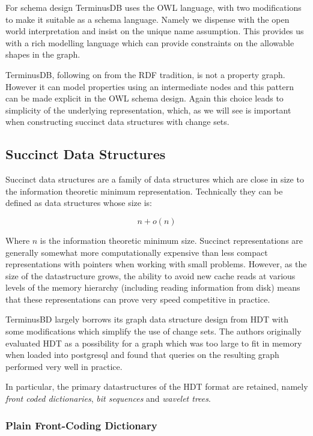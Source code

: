 \documentclass[10pt, a4paper, twocolumn]{article} %
\begin{document}
For schema design TerminusDB uses the OWL language, with two
modifications to make it suitable as a schema language. Namely we
dispense with the open world interpretation and insist on the unique
name assumption\cite{DBLP:journals/semweb/FeeneyMB18}. This provides
us with a rich modelling language which can provide constraints on the
allowable shapes in the graph.

TerminusDB, following on from the RDF tradition, is not a property
graph. However it can model properties using an intermediate nodes and
this pattern can be made explicit in the OWL schema design. Again this
choice leads to simplicity of the underlying representation, which, as
we will see is important when constructing succinct data structures
with change sets.

\subsection{Succinct Data Structures}

Succinct data structures\cite{Jacobson:1988:SSD:915547} are a family of
data structures which are close in size to the information theoretic
minimum representation. Technically they can be defined as data structures
whose size is:

\[ n + o(n) \]

Where \(n\) is the information theoretic minimum size. Succinct
representations are generally somewhat more computationally expensive
than less compact representations with pointers when working with
small problems. However, as the size of the datastructure grows, the
ability to avoid new cache reads at various levels of the memory
hierarchy (including reading information from disk) means that these
representations can prove very speed
competitive\cite{doi:10.1002/spe.2198} in practice.

TerminusBD largely borrows its graph data structure design from
HDT\cite{10.1007/978-3-642-30284-8_36} with some modifications which
simplify the use of change sets. The authors originally evaluated HDT
as a possibility for a graph which was too large to fit in memory when
loaded into postgresql and found that queries on the resulting graph
performed very well in practice.

In particular, the primary datastructures of the HDT format are
retained, namely {\em front coded dictionaries}, {\em bit sequences}
and {\em wavelet trees}.

\subsubsection{Plain Front-Coding Dictionary}
\end{document}
